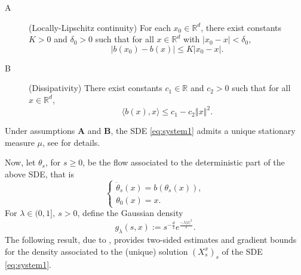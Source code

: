 \documentclass{amsart}
\newcommand\bR{{\mathbb R}}
\newcommand{\norm}[1]{\left\Vert#1\right\Vert}
\begin{document}
\begin{description}
\item[A] (Locally-Lipschitz continuity) For each \(x_0\in\bR^d\), there exist constants $K>0$ and \(\delta_0>0\) such that for all $ x \in {\mathbb{R}^d}$ with \(|x_0-x|<\delta_0\),
\begin{equation}\label{eq:lipschitz}
|b(x_0)-b(x)|\leq K|x_0-x|.
\end{equation}

\item[B] (Dissipativity) There exist constants $c_1 \in \mathbb{R}$ and $c_2>0$ such that for all $x \in \mathbb{R}^d $, 
\begin{equation}  \label{eq:dissiphyp}
\langle b(x), x \rangle \leq c_1 - c_2 \norm{x}^2 .
\end{equation}
\end{description}

Under assumptions \textbf{A} and \textbf{B}, the SDE \eqref{eq:system1} admits a unique stationary measure $\mu$, see \cite[Section~4.1]{FGGV24} for details. 


Now, let $\theta _{s}$, for $s\geq 0$, be the flow associated to the deterministic part of the above SDE, that is
\begin{equation*}
\left\{ 
\begin{array}{l}
\dot{\theta}_{s}(x)=b(\theta_{s}(x)), \\ 
\theta _{0}(x)=x.%
\end{array}%
\right.
\end{equation*}
For $\lambda \in (0,1],\  s>0$, define the Gaussian density
\begin{equation*}
g_{\lambda}(s,x):=s^{-\frac{d}{2}}e^{\frac{-\lambda |x|^{2}}{s}}.
\end{equation*}
The following result, due to \cite{MPZ}, provides two-sided estimates and gradient bounds for the density associated to the (unique) solution $(X_s^x)_s$ of the SDE \eqref{eq:system1}.
\end{document}
